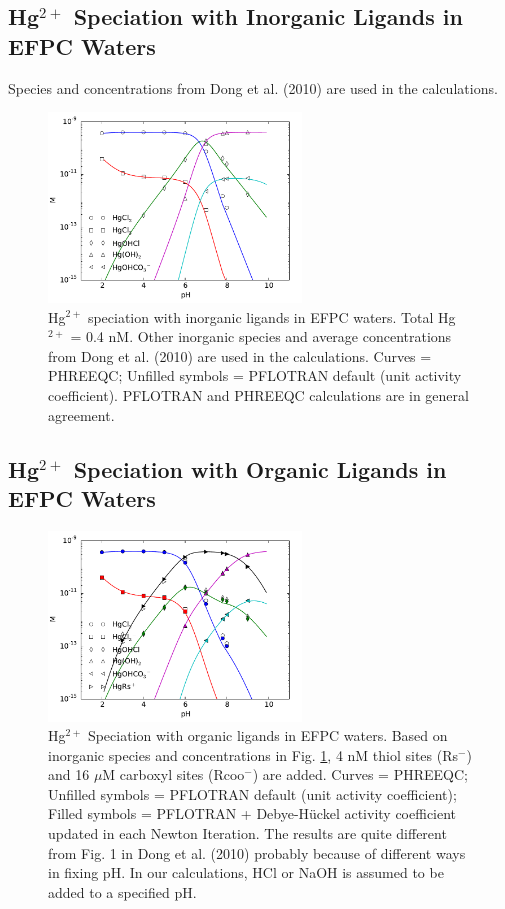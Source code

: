 \documentclass[12pt, a4paper]{article}
\begin{document}
\subsection{Hg$^{2+}$ Speciation with Inorganic Ligands in EFPC Waters}
Species and concentrations from Dong et al. (2010) are used in the calculations. 
\begin{figure}[ht]
\centering
\includegraphics[width=0.6\textwidth]{../pflotran/speciation/Dong2010/ex1/comp.pdf}
\caption{
Hg$^{2+}$ speciation with inorganic ligands in EFPC waters. Total
Hg$^{2+}$ = 0.4 nM. Other inorganic species and average concentrations from Dong
et al. (2010) are used in the calculations. Curves = PHREEQC; Unfilled symbols
= PFLOTRAN default (unit activity coefficient). PFLOTRAN and PHREEQC
calculations are in general agreement.
}
\label{fig1}
\end{figure}

\newpage
\subsection{Hg$^{2+}$ Speciation with Organic Ligands in EFPC Waters}
\begin{figure}[ht]
\centering
\includegraphics[width=0.6\textwidth]{../pflotran/speciation/Dong2010/ex2/ex2.pdf}
\caption{
Hg$^{2+}$ Speciation with organic ligands in EFPC waters. Based on
inorganic species and concentrations in Fig. \ref{fig1}, 4 nM thiol sites (Rs$^-$) and
16 $\mu$M carboxyl sites (Rcoo$^-$) are added. Curves = PHREEQC; Unfilled
symbols = PFLOTRAN default (unit activity coefficient); Filled symbols = PFLOTRAN +
Debye-Hückel activity coefficient updated in each Newton Iteration. 
The results are quite different from Fig. 1 in Dong et al. (2010) probably
because of different ways in fixing pH. In our calculations, HCl or NaOH is
assumed to be added to a specified pH.
}
\label{fig2}
\end{figure}
\end{document}
